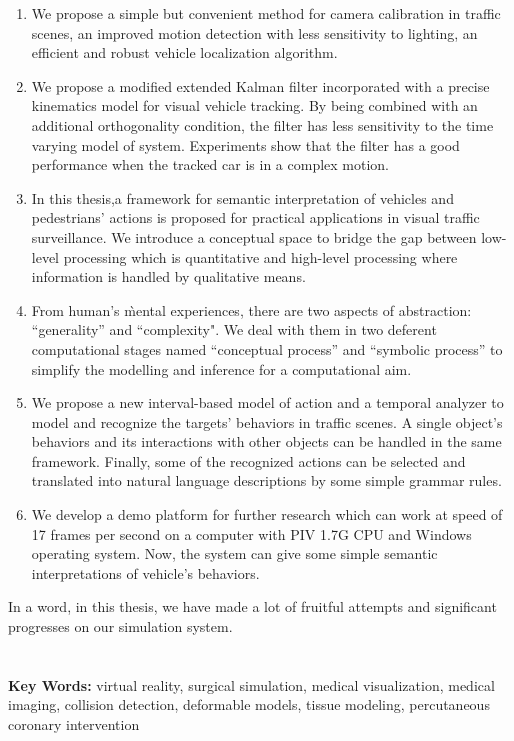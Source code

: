 \begin{enumerate}
    \item We propose a simple but convenient method for camera calibration in
    traffic scenes, an improved motion detection with less sensitivity to lighting,
    an efficient and robust vehicle localization algorithm.
    \item We propose a modified extended Kalman filter incorporated with a precise
    kinematics model for visual vehicle tracking. By being combined with an additional orthogonality
    condition, the filter has less sensitivity to the time varying model of system. Experiments
    show that the filter has a good performance when the tracked car is in a complex motion.
    \item In this thesis,a framework for semantic interpretation of vehicles and pedestrians'
    actions is proposed for practical applications in visual traffic surveillance.  We introduce
    a conceptual space to bridge the gap between low-level processing which is quantitative
    and high-level processing where information is handled by qualitative means.
    \item From human's \`mental experiences, there are two aspects of abstraction: ``generality'' and
    ``complexity". We deal with them in two deferent computational stages named ``conceptual process'' and ``symbolic process'' to
    simplify the modelling and inference for a computational aim.
    \item We propose a new interval-based model of action and a temporal analyzer to model and
    recognize the targets' behaviors in traffic scenes. A single object's behaviors and its
    interactions with other objects can be handled in the same framework. Finally, some of the recognized
    actions can be selected and translated into natural language descriptions by some simple grammar
    rules.
    \item We develop a demo platform for further research which can work at
    speed of 17 frames per second on a computer with PIV 1.7G CPU and Windows
    operating system. Now, the system can give some simple semantic interpretations
    of vehicle's behaviors.
\end{enumerate}

In a word, in this thesis, we have made a lot of fruitful attempts and significant
progresses on our simulation system.
\\
\\
\\
\noindent \textbf{Key Words:} virtual reality, surgical simulation, medical
visualization, medical imaging, collision detection, deformable models, tissue modeling,
percutaneous coronary intervention
